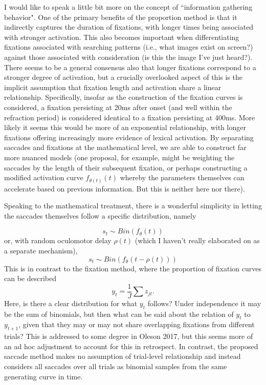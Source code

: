 \documentclass{article}
\begin{document}
I would like to speak a little bit more on the concept of ``information gathering behavior". One of the primary benefits of the proportion method is that it indirectly captures the duration of fixations, with longer times being associated with stronger activation. This also becomes important when differentiating fixations associated with searching patterns (i.e., what images exist on screen?) against those associated with consideration (is this the image I've just heard?). There seems to be a general consensus also that longer fixations correspond to a stronger degree of activation, but a crucially overlooked aspect of this is the implicit assumption that fixation length and activation share a linear relationship. Specifically, insofar as the construction of the fixation curves is considered, a fixation persisting at 20ms after onset (and well within the refraction period) is considered identical to a fixation persisting at 400ms. More likely it seems this would be more of an exponential relationship, with longer fixations offering increasingly more evidence of lexical activation. By separating saccades and fixations at the mathematical level, we are able to construct far more nuanced models (one proposal, for example, might be weighting the saccades by the length of their subsequent fixation, or perhaps constructing a modified activation curve $f_{\theta(t)}(t)$ whereby the parameters themselves can accelerate based on previous information. But this is neither here nor there).

Speaking to the mathematical treatment, there is a wonderful simplicity in letting the saccades themselves follow a specific distribution, namely

\begin{equation} \label{eq:saccade_dist}
s_t \sim Bin(f_{\theta}(t))
\end{equation}
or, with random oculomotor delay $\rho(t)$ (which I haven't really elaborated on as a separate mechanism), 
\begin{equation} \label{eq:saccade_dist_rho}
s_t \sim Bin(f_{\theta}(t-\rho(t)))
\end{equation}
This is in contrast to the fixation method, where the proportion of fixation curves can be described
\begin{equation} \label{eq:single_fix_measure}
y_t = \frac{1}{J} \sum z_{jt}.
\end{equation}
Here, is there a clear distribution for what $y_t$ follows? Under independence it may be the sum of binomials, but then what can be said about the relation of $y_t$ to $y_{t+1}$, given that they may or may not share overlapping fixations from different trials? This is addressed to some degree in Oleson 2017, but this seems more of an ad hoc adjustment to account for this in retrospect. In contrast, the proposed saccade method makes no assumption of trial-level relationship and instead considers all saccades over all trials as binomial samples from the same generating curve in time.
\end{document}

